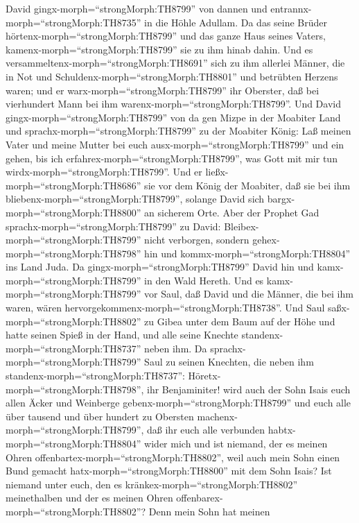  David gingx-morph=``strongMorph:TH8799'' von dannen und
entrannx-morph=``strongMorph:TH8735'' in die Höhle Adullam. Da das seine
Brüder hörtenx-morph=``strongMorph:TH8799'' und das ganze Haus seines
Vaters, kamenx-morph=``strongMorph:TH8799'' sie zu ihm hinab dahin.
 Und es versammeltenx-morph=``strongMorph:TH8691'' sich zu
ihm allerlei Männer, die in Not und
Schuldenx-morph=``strongMorph:TH8801'' und betrübten Herzens waren; und
er warx-morph=``strongMorph:TH8799'' ihr Oberster, daß bei vierhundert
Mann bei ihm warenx-morph=``strongMorph:TH8799''.  Und David
gingx-morph=``strongMorph:TH8799'' von da gen Mizpe in der Moabiter Land
und sprachx-morph=``strongMorph:TH8799'' zu der Moabiter König: Laß
meinen Vater und meine Mutter bei euch ausx-morph=``strongMorph:TH8799''
und ein gehen, bis ich erfahrex-morph=``strongMorph:TH8799'', was Gott
mit mir tun wirdx-morph=``strongMorph:TH8799''.  Und er
ließx-morph=``strongMorph:TH8686'' sie vor dem König der Moabiter, daß
sie bei ihm bliebenx-morph=``strongMorph:TH8799'', solange David sich
bargx-morph=``strongMorph:TH8800'' an sicherem Orte.  Aber
der Prophet Gad sprachx-morph=``strongMorph:TH8799'' zu David:
Bleibex-morph=``strongMorph:TH8799'' nicht verborgen, sondern
gehex-morph=``strongMorph:TH8798'' hin und
kommx-morph=``strongMorph:TH8804'' ins Land Juda. Da
gingx-morph=``strongMorph:TH8799'' David hin und
kamx-morph=``strongMorph:TH8799'' in den Wald Hereth.  Und
es kamx-morph=``strongMorph:TH8799'' vor Saul, daß David und die Männer,
die bei ihm waren, wären hervorgekommenx-morph=``strongMorph:TH8738''.
Und Saul saßx-morph=``strongMorph:TH8802'' zu Gibea unter dem Baum auf
der Höhe und hatte seinen Spieß in der Hand, und alle seine Knechte
standenx-morph=``strongMorph:TH8737'' neben ihm.  Da
sprachx-morph=``strongMorph:TH8799'' Saul zu seinen Knechten, die neben
ihm standenx-morph=``strongMorph:TH8737'':
Höretx-morph=``strongMorph:TH8798'', ihr Benjaminiter! wird auch der
Sohn Isais euch allen Äcker und Weinberge
gebenx-morph=``strongMorph:TH8799'' und euch alle über tausend und über
hundert zu Obersten machenx-morph=``strongMorph:TH8799'', 
daß ihr euch alle verbunden habtx-morph=``strongMorph:TH8804'' wider
mich und ist niemand, der es meinen Ohren
offenbartex-morph=``strongMorph:TH8802'', weil auch mein Sohn einen Bund
gemacht hatx-morph=``strongMorph:TH8800'' mit dem Sohn Isais? Ist
niemand unter euch, den es kränkex-morph=``strongMorph:TH8802''
meinethalben und der es meinen Ohren
offenbarex-morph=``strongMorph:TH8802''? Denn mein Sohn hat meinen
